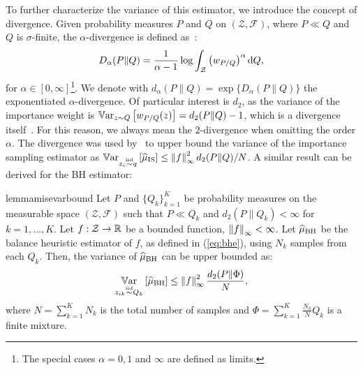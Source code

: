 \documentclass{article}
\begin{document}
To further characterize the variance of this estimator, we introduce the concept of \Renyi divergence. Given probability measures $P$ and $Q$ on $(\mathcal{Z},\mathcal{F})$, where $P\ll Q$ and $Q$ is $\sigma$-finite, the $\alpha$-\Renyi divergence is defined as~\cite{renyi1961measures}:
\begin{align}\label{eq:renyi}
	D_{\alpha}(P\|Q) = \frac{1}{\alpha-1}\log\int_{\mathcal{Z}}\left(w_{P/Q}\right)^{\alpha}\de Q,
\end{align}
for $\alpha\in[0,\infty]$\footnote{The special cases $\alpha=0,1$ and $\infty$ are defined as limits.}.
We denote with $d_{\alpha}(P\|Q) = \exp\{D_{\alpha}(P\|Q)\}$ the exponentiated $\alpha$-\Renyi divergence. Of particular interest is $d_2$, as the variance of the importance weight is $\Var_{z\sim Q}\left[w_{P/Q}(z)\right] = d_2(P\|Q) - 1$, which is a divergence itself~\citep{cortes2010learning}. For this reason, we always mean the $2$-\Renyi divergence when omitting the order $\alpha$. The \Renyi divergence was used by~\citet[][Lemma 4.1]{metelli2018policy} to upper bound the variance of the importance sampling estimator as $\Var_{z_i\simiid q}\left[\wh{\mu}_{\text{IS}}\right]\leq \norm[\infty]{f}^2d_2(P\|Q)/N$. A similar result can be derived for the BH estimator:
%
\begin{restatable}{lemma}{misevarbound}\label{lem:misevarbound}
	Let $P$ and $\{ Q_k \}_{k=1}^K$ be probability measures on the measurable space $(\mathcal{Z},\mathcal{F})$ such that $P\ll Q_k$ and $d_2(P\|Q_k)<\infty$ for $k=1,\dots,K$. Let $f:\mathcal{Z}\to\Reals$ be a bounded function, \ie $\norm[\infty]{f}<\infty$. Let $\wh{\mu}_{\text{BH}}$ be the balance heuristic estimator of $f$, as defined in (\ref{eq:bhe}), using $N_k$ \iid samples from each $Q_k$. Then, the variance of $\wh{\mu}_{\text{BH}}$ can be upper bounded as:
	\begin{align*}
		\Var_{z_{ik}\simiid Q_k}\left[\wh{\mu}_{\text{BH}}\right] \leq \norm[\infty]{f}^2\frac{d_2(P\|\Phi)}{N},
	\end{align*}
	where ${N=\sum_{k=1}^{K}N_k}$ is the total number of samples and ${\Phi=\sum_{k=1}^K\frac{N_k}{N}Q_k}$ is a finite mixture.
\end{restatable}
%
\end{document}
